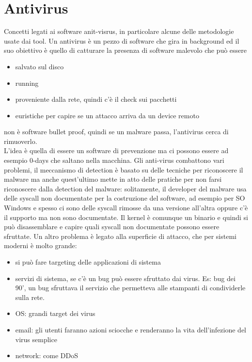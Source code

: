 \documentclass[12pt, oneside]{extbook} %
\begin{document}
\section{Antivirus}
Concetti legati ai software anit-visrus, in particolare alcune delle metodologie usate dai tool. Un antivirus è un pezzo di software che gira in background ed il suo obiettivo è quello di catturare la presenza di software malevolo che può essere
\begin{itemize}
\item salvato sul disco
\item running
\item proveniente dalla rete, quindi c'è il check sui pacchetti
\item euristiche per capire se un attacco arriva da un device remoto
\end{itemize}
non è software bullet proof, quindi se un malware passa, l'antivirus cerca di rimuoverlo.\\L'idea è quella di essere un software di prevenzione ma ci possono essere ad esempio 0-days che saltano nella macchina. Gli anti-virus combattono vari problemi, il meccanismo di detection è basato su delle tecniche per riconoscere il malware ma anche quest'ultimo mette in atto delle pratiche per non farsi riconoscere dalla detection del malware: solitamente, il developer del malware usa delle syscall non documentate per la costruzione del software, ad esempio per SO Windows e spesso ci sono delle syscall rimosse da una versione all'altra oppure c'è il supporto ma non sono documentate. Il kernel è comunque un binario e quindi si può disassemblare e capire quali syscall non documentate possono essere sfruttate. Un altro problema è legato alla superficie di attacco, che per sistemi moderni è molto grande:
\begin{itemize}
\item si può fare targeting delle applicazioni di sistema
\item servizi di sistema, se c'è un bug può essere sfruttato dai virus. Es: bug dei 90', un bug sfruttava il servizio che permetteva alle stampanti di condividerle sulla rete.
\item OS: grandi target dei virus
\item email: gli utenti faranno azioni sciocche e renderanno la vita dell'infezione del virus semplice
\item network: come DDoS
\end{itemize}
\end{document}
